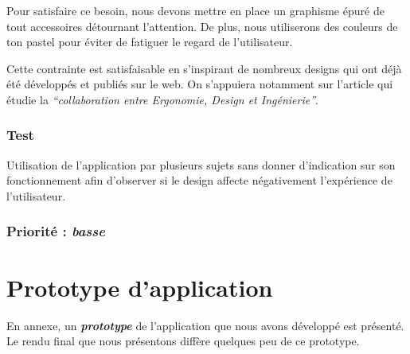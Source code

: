 Pour satisfaire ce besoin, nous devons mettre en place un graphisme épuré de tout accessoires détournant l’attention. De plus, nous utiliserons des couleurs de ton pastel pour éviter de fatiguer le regard de l’utilisateur.

Cette contrainte est satisfaisable en s’inspirant de nombreux designs qui ont déjà été développés et publiés sur le web. On s’appuiera notamment sur l’article \cite{lente2014scenariser} qui étudie la \textit{“collaboration entre Ergonomie, Design et Ingénierie”}.

\subsubsection{Test}

Utilisation de l’application par plusieurs sujets sans donner d’indication sur son fonctionnement afin d’observer si le design affecte négativement l'expérience de l’utilisateur.

\subsubsection{Priorité : \textit{basse}}

\section{Prototype d'application}

 En annexe, un \textbf{\textit{prototype}} de l'application que nous avons développé est présenté. Le rendu final que nous présentons diffère quelques peu de ce prototype.


